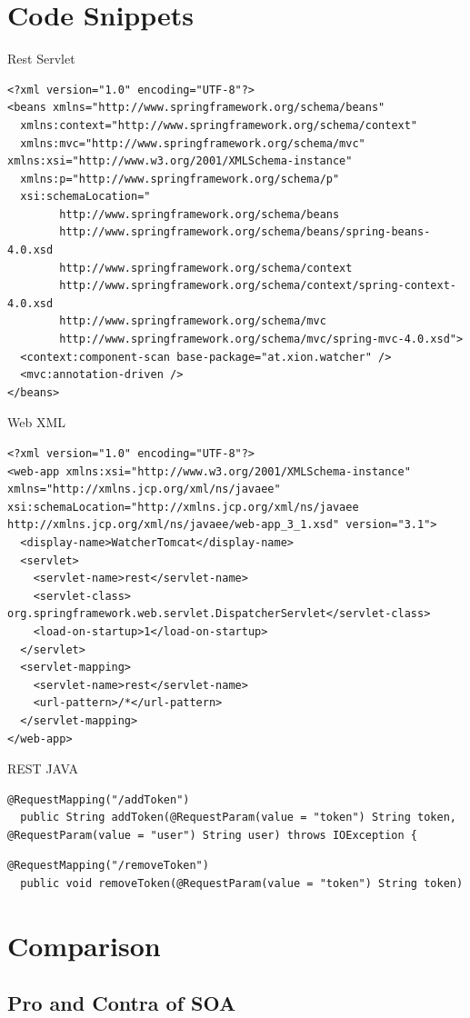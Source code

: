 \documentclass[12pt]{article}
\begin{document}
\section{Code Snippets}
Rest Servlet
\begin{lstlisting}
<?xml version="1.0" encoding="UTF-8"?>
<beans xmlns="http://www.springframework.org/schema/beans"
  xmlns:context="http://www.springframework.org/schema/context"
  xmlns:mvc="http://www.springframework.org/schema/mvc" xmlns:xsi="http://www.w3.org/2001/XMLSchema-instance"
  xmlns:p="http://www.springframework.org/schema/p"
  xsi:schemaLocation="
        http://www.springframework.org/schema/beans     
        http://www.springframework.org/schema/beans/spring-beans-4.0.xsd
        http://www.springframework.org/schema/context
        http://www.springframework.org/schema/context/spring-context-4.0.xsd
        http://www.springframework.org/schema/mvc
        http://www.springframework.org/schema/mvc/spring-mvc-4.0.xsd">
  <context:component-scan base-package="at.xion.watcher" />
  <mvc:annotation-driven />
</beans>
\end{lstlisting}
Web XML
\begin{lstlisting}
<?xml version="1.0" encoding="UTF-8"?>
<web-app xmlns:xsi="http://www.w3.org/2001/XMLSchema-instance" xmlns="http://xmlns.jcp.org/xml/ns/javaee" xsi:schemaLocation="http://xmlns.jcp.org/xml/ns/javaee http://xmlns.jcp.org/xml/ns/javaee/web-app_3_1.xsd" version="3.1">
  <display-name>WatcherTomcat</display-name>
  <servlet>
    <servlet-name>rest</servlet-name>
    <servlet-class> org.springframework.web.servlet.DispatcherServlet</servlet-class>
    <load-on-startup>1</load-on-startup>
  </servlet>
  <servlet-mapping>
    <servlet-name>rest</servlet-name>
    <url-pattern>/*</url-pattern>
  </servlet-mapping>
</web-app>
\end{lstlisting}
REST JAVA
\begin{lstlisting}
@RequestMapping("/addToken")
  public String addToken(@RequestParam(value = "token") String token, @RequestParam(value = "user") String user) throws IOException {
\end{lstlisting}
\begin{lstlisting}
@RequestMapping("/removeToken")
  public void removeToken(@RequestParam(value = "token") String token)
\end{lstlisting}
\section{Comparison}
\subsection{Pro and Contra of SOA}
\end{document}

